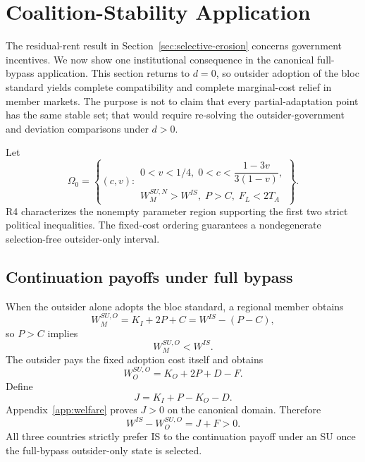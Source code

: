 \section{Coalition-Stability Application}
\label{sec:coalition-stability}

The residual-rent result in Section~\ref{sec:selective-erosion} concerns government incentives. We now show one institutional consequence in the canonical full-bypass application. This section returns to $d=0$, so outsider adoption of the bloc standard yields complete compatibility and complete marginal-cost relief in member markets. The purpose is not to claim that every partial-adaptation point has the same stable set; that would require re-solving the outsider-government and deviation comparisons under $d>0$.

Let
\begin{equation}
\Omega_0
=
\left\{
(c,v):
\begin{array}{l}
0<v<1/4,\;
0<c<\dfrac{1-3v}{3(1-v)},\\[2mm]
W_M^{SU,N}>W^{IS},\;
P>C,\;
F_L<2T_A
\end{array}
\right\}.
\label{eq:omega-zero}
\end{equation}
R4 characterizes the nonempty parameter region supporting the first two strict political inequalities. The fixed-cost ordering guarantees a nondegenerate selection-free outsider-only interval.

\subsection{Continuation payoffs under full bypass}
\label{subsec:coalition-full-bypass-payoffs}

When the outsider alone adopts the bloc standard, a regional member obtains
\begin{equation}
    W_M^{SU,O}
    =
    K_I+2P+C
    =
    W^{IS}-(P-C),
    \label{eq:member-intermediate-welfare}
\end{equation}
so $P>C$ implies
\[
W_M^{SU,O}<W^{IS}.
\]
The outsider pays the fixed adoption cost itself and obtains
\begin{equation}
    W_O^{SU,O}
    =
    K_O+2P+D-F.
    \label{eq:outsider-welfare-bypass}
\end{equation}
Define
\begin{equation}
    J=K_I+P-K_O-D.
    \label{eq:j-definition}
\end{equation}
Appendix~\ref{app:welfare} proves $J>0$ on the canonical domain. Therefore
\begin{equation}
    W^{IS}-W_O^{SU,O}
    =
    J+F>0.
    \label{eq:outsider-is-gap}
\end{equation}
All three countries strictly prefer IS to the continuation payoff under an SU once the full-bypass outsider-only state is selected.

